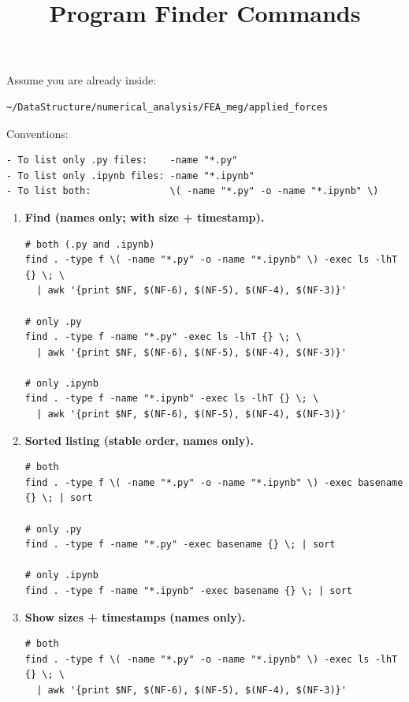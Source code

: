 \documentclass[11pt]{article}
\title{Program Finder Commands}
\date{}
\begin{document}
\maketitle

Assume you are already inside:
\begin{verbatim}
~/DataStructure/numerical_analysis/FEA_meg/applied_forces
\end{verbatim}

Conventions:
\begin{verbatim}
- To list only .py files:    -name "*.py"
- To list only .ipynb files: -name "*.ipynb"
- To list both:              \( -name "*.py" -o -name "*.ipynb" \)
\end{verbatim}

\begin{enumerate}
\item \textbf{Find (names only; with size + timestamp).}

\begin{verbatim}
# both (.py and .ipynb)
find . -type f \( -name "*.py" -o -name "*.ipynb" \) -exec ls -lhT {} \; \
  | awk '{print $NF, $(NF-6), $(NF-5), $(NF-4), $(NF-3)}'

# only .py
find . -type f -name "*.py" -exec ls -lhT {} \; \
  | awk '{print $NF, $(NF-6), $(NF-5), $(NF-4), $(NF-3)}'

# only .ipynb
find . -type f -name "*.ipynb" -exec ls -lhT {} \; \
  | awk '{print $NF, $(NF-6), $(NF-5), $(NF-4), $(NF-3)}'
\end{verbatim}

\item \textbf{Sorted listing (stable order, names only).}

\begin{verbatim}
# both
find . -type f \( -name "*.py" -o -name "*.ipynb" \) -exec basename {} \; | sort

# only .py
find . -type f -name "*.py" -exec basename {} \; | sort

# only .ipynb
find . -type f -name "*.ipynb" -exec basename {} \; | sort
\end{verbatim}

\item \textbf{Show sizes + timestamps (names only).}

\begin{verbatim}
# both
find . -type f \( -name "*.py" -o -name "*.ipynb" \) -exec ls -lhT {} \; \
  | awk '{print $NF, $(NF-6), $(NF-5), $(NF-4), $(NF-3)}'
\end{verbatim}


\end{enumerate}
\end{document}
